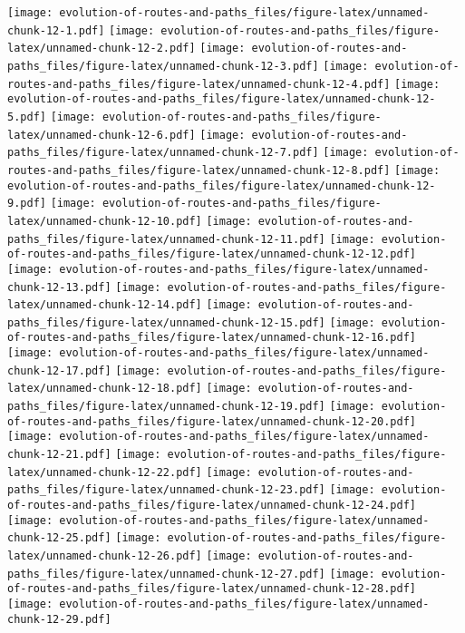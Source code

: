 \documentclass[]{elsarticle} %
\makeatletter
\def\maxwidth{\ifdim\Gin@nat@width>\linewidth\linewidth
\else\Gin@nat@width\fi}
\let\Oldincludegraphics\includegraphics
\renewcommand{\includegraphics}[1]{\Oldincludegraphics[width=\maxwidth]{#1}}
\makeatother
\begin{document}
\texttt{[image: evolution-of-routes-and-paths\_files/figure-latex/unnamed-chunk-12-1.pdf]}
\texttt{[image: evolution-of-routes-and-paths\_files/figure-latex/unnamed-chunk-12-2.pdf]}
\texttt{[image: evolution-of-routes-and-paths\_files/figure-latex/unnamed-chunk-12-3.pdf]}
\texttt{[image: evolution-of-routes-and-paths\_files/figure-latex/unnamed-chunk-12-4.pdf]}
\texttt{[image: evolution-of-routes-and-paths\_files/figure-latex/unnamed-chunk-12-5.pdf]}
\texttt{[image: evolution-of-routes-and-paths\_files/figure-latex/unnamed-chunk-12-6.pdf]}
\texttt{[image: evolution-of-routes-and-paths\_files/figure-latex/unnamed-chunk-12-7.pdf]}
\texttt{[image: evolution-of-routes-and-paths\_files/figure-latex/unnamed-chunk-12-8.pdf]}
\texttt{[image: evolution-of-routes-and-paths\_files/figure-latex/unnamed-chunk-12-9.pdf]}
\texttt{[image: evolution-of-routes-and-paths\_files/figure-latex/unnamed-chunk-12-10.pdf]}
\texttt{[image: evolution-of-routes-and-paths\_files/figure-latex/unnamed-chunk-12-11.pdf]}
\texttt{[image: evolution-of-routes-and-paths\_files/figure-latex/unnamed-chunk-12-12.pdf]}
\texttt{[image: evolution-of-routes-and-paths\_files/figure-latex/unnamed-chunk-12-13.pdf]}
\texttt{[image: evolution-of-routes-and-paths\_files/figure-latex/unnamed-chunk-12-14.pdf]}
\texttt{[image: evolution-of-routes-and-paths\_files/figure-latex/unnamed-chunk-12-15.pdf]}
\texttt{[image: evolution-of-routes-and-paths\_files/figure-latex/unnamed-chunk-12-16.pdf]}
\texttt{[image: evolution-of-routes-and-paths\_files/figure-latex/unnamed-chunk-12-17.pdf]}
\texttt{[image: evolution-of-routes-and-paths\_files/figure-latex/unnamed-chunk-12-18.pdf]}
\texttt{[image: evolution-of-routes-and-paths\_files/figure-latex/unnamed-chunk-12-19.pdf]}
\texttt{[image: evolution-of-routes-and-paths\_files/figure-latex/unnamed-chunk-12-20.pdf]}
\texttt{[image: evolution-of-routes-and-paths\_files/figure-latex/unnamed-chunk-12-21.pdf]}
\texttt{[image: evolution-of-routes-and-paths\_files/figure-latex/unnamed-chunk-12-22.pdf]}
\texttt{[image: evolution-of-routes-and-paths\_files/figure-latex/unnamed-chunk-12-23.pdf]}
\texttt{[image: evolution-of-routes-and-paths\_files/figure-latex/unnamed-chunk-12-24.pdf]}
\texttt{[image: evolution-of-routes-and-paths\_files/figure-latex/unnamed-chunk-12-25.pdf]}
\texttt{[image: evolution-of-routes-and-paths\_files/figure-latex/unnamed-chunk-12-26.pdf]}
\texttt{[image: evolution-of-routes-and-paths\_files/figure-latex/unnamed-chunk-12-27.pdf]}
\texttt{[image: evolution-of-routes-and-paths\_files/figure-latex/unnamed-chunk-12-28.pdf]}
\texttt{[image: evolution-of-routes-and-paths\_files/figure-latex/unnamed-chunk-12-29.pdf]}
\end{document}
